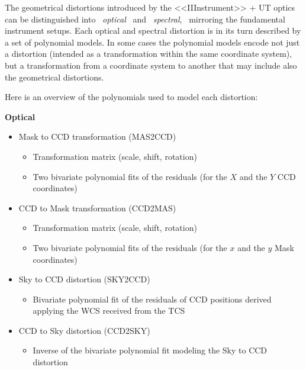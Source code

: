 The geometrical distortions introduced by the <<IIInstrument>> + UT optics
can be distinguished into \ {\it optical} \ and \ {\it spectral},
\ mirroring the fundamental instrument setups. Each optical and spectral 
distortion is in its turn described by a set of polynomial models. In some
cases the polynomial models encode not just a distortion (intended
as a transformation within the same coordinate system), but a transformation
from a coordinate system to another that may include
also the geometrical distortions.

Here is an overview of the polynomials used to model each distortion:

\begin{description}
  \item {\bf Optical}
  \begin{itemize}
    \item Mask to CCD transformation (MAS2CCD)
    \begin{itemize}
      \item Transformation matrix (scale, shift, rotation)
      \item Two bivariate polynomial fits of the residuals (for the
            $X$ and the $Y$ CCD coordinates)
    \end{itemize}
    \item CCD to Mask transformation (CCD2MAS)
    \begin{itemize}
      \item Transformation matrix (scale, shift, rotation)
      \item Two bivariate polynomial fits of the residuals (for the
            $x$ and the $y$ Mask coordinates)
    \end{itemize}
    \item Sky to CCD distortion (SKY2CCD)
    \begin{itemize}
      \item Bivariate polynomial fit of the residuals of CCD positions
            derived applying the WCS received from the TCS
    \end{itemize}
    \item CCD to Sky distortion (CCD2SKY)
    \begin{itemize}
      \item Inverse of the bivariate polynomial fit modeling the Sky 
            to CCD distortion
    \end{itemize}
  \end{itemize}
\end{description}

